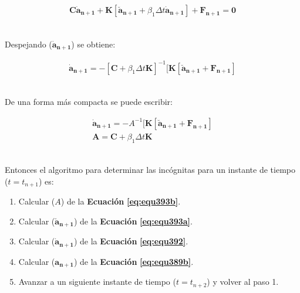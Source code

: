 \begin{ceqn} %
\begin{gather}\label{eq:equ391}
 \mathbf{C}\mathbf{\dot{a}_{n+1}} + \mathbf{K}[\mathbf{\breve{a}_{n+1}} + \beta_1 \Delta t \mathbf{\dot{a}_{n+1}}] + \mathbf{F_{n+1}} = \mathbf{0}
\end{gather}   
\end{ceqn}
\\
Despejando ($\mathbf{\dot{a}_{n+1}}$) se obtiene:

\begin{ceqn} %
\begin{gather}\label{eq:equ392}
 \mathbf{\dot{a}_{n+1}} = -[\mathbf{C} + \beta_1 \Delta t \mathbf{K}]^{-1}[\mathbf{K}[\mathbf{\breve{a}_{n+1}} + \mathbf{F_{n+1}}]
\end{gather}   
\end{ceqn}
\\
De una forma más compacta se puede escribir:

\begin{ceqn} 
\begin{subequations} \label{eq:equ393} 
\begin{gather}
\mathbf{\dot{a}_{n+1}} = -A^{-1}[\mathbf{K}[\mathbf{\breve{a}_{n+1}} + \mathbf{F_{n+1}}]  \label{eq:equ393a}\\[12pt]
\mathbf{A} = \mathbf{C} + \beta_1 \Delta t \mathbf{K} \label{eq:equ393b}
\end{gather}  
\end{subequations} 
\end{ceqn}
\\
Entonces el algoritmo para determinar las incógnitas para un instante de tiempo ($t=t_{n+1}$) es:

\begin{enumerate}
    \item Calcular ($A$) de la \textbf{Ecuación} \textbf{\ref{eq:equ393b}}.
    \item Calcular ($\mathbf{\breve{a}_{n+1}}$) de la \textbf{Ecuación} \textbf{\ref{eq:equ393a}}.
    \item Calcular ($\mathbf{\dot{a}_{n+1}}$) de la \textbf{Ecuación} \textbf{\ref{eq:equ392}}.
    \item Calcular ($\mathbf{a_{n+1}}$) de la \textbf{Ecuación} \textbf{\ref{eq:equ389b}}.
    \item Avanzar a un siguiente instante de tiempo ($t=t_{n+2}$) y volver al paso 1.
\end{enumerate}
\bigskip

